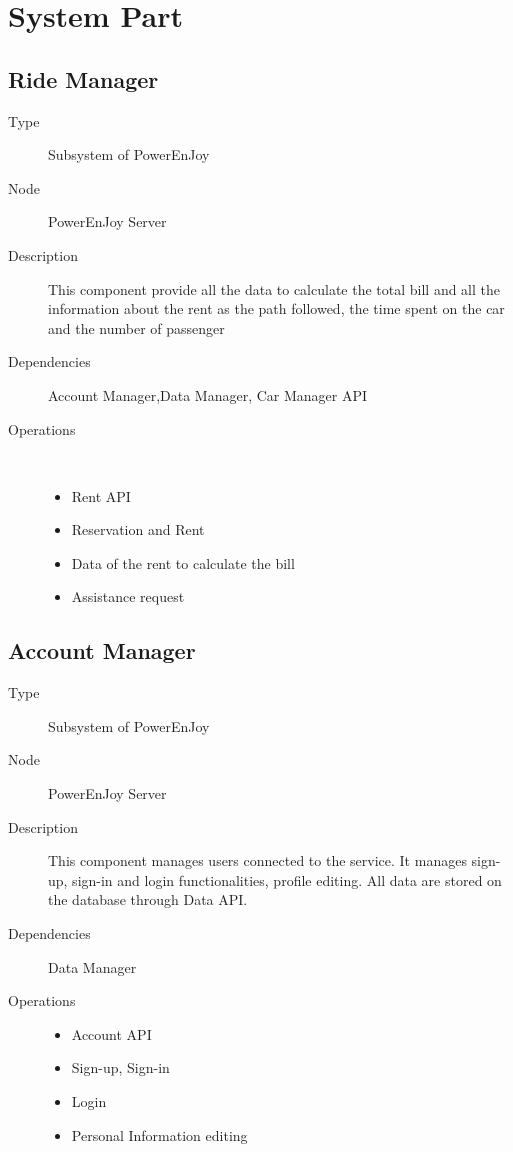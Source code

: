 \section{System Part}
\subsection{Ride Manager}
\begin{description}
	\item[Type] Subsystem of PowerEnJoy
	\item[Node] PowerEnJoy Server
	\item[Description] This component provide all the data to calculate the total bill and all the information about the rent as the path followed, the time spent on the car and the number of passenger
	\item[Dependencies] Account Manager,Data Manager, Car Manager API
	\item[Operations] \ \\
		\begin{itemize}
			\item Rent API
			\item Reservation and Rent 
			\item Data of the rent to calculate the bill
			\item Assistance request
	\end{itemize}
\end{description}

\subsection{Account Manager}
\begin{description}
	\item[Type] Subsystem of PowerEnJoy
	\item[Node] PowerEnJoy Server
	\item[Description] This component manages users connected to the service. It manages sign-up, sign-in and login functionalities, profile editing. All data are stored on the database through Data API.
	\item[Dependencies] Data Manager
	\item[Operations] 
		\begin{itemize}
			\item Account API
			\item Sign-up, Sign-in
			\item Login  
			\item Personal Information editing 
	\end{itemize}
\end{description}


